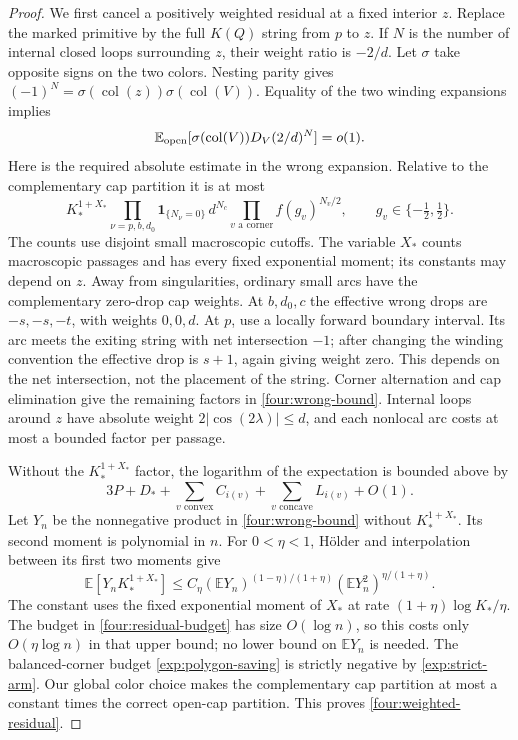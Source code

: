 \begin{proof}
We first cancel a positively weighted residual at a fixed interior $z$.
Replace the marked primitive by the full $K(Q)$ string from $p$ to $z$.
If $N$ is the number of internal closed loops surrounding $z$, their
weight ratio is $-2/d$.  Let $\sigma$ take opposite signs on the two
colors.  Nesting parity gives
$(-1)^N=\sigma(\operatorname{col}(z))\sigma(\operatorname{col}(V))$.
Equality of the two winding expansions implies
\begin{equation}
 \mathbb E_{\rm open}
       [\sigma(\operatorname{col}(V))D_V(2/d)^N]=o(1).
 \label{four:weighted-residual}
\end{equation}
Here is the required absolute estimate in the wrong expansion.
Relative to the complementary cap partition it is at most
\begin{equation}
 K_*^{1+X_*}
 \prod_{\nu=p,b,d_0}\mathbf1_{\{N_\nu=0\}}\,
 d^{N_c}\prod_{v\text{ a corner}}f(g_v)^{N_v/2},
 \qquad g_v\in\{-\tfrac12,\tfrac12\}.
 \label{four:wrong-bound}
\end{equation}
The counts use disjoint small macroscopic cutoffs.  The variable $X_*$
counts macroscopic passages and has every fixed exponential moment;
its constants may depend on $z$.  Away from singularities, ordinary
small arcs have the complementary zero-drop cap weights.  At $b,d_0,c$
the effective wrong drops are $-s,-s,-t$, with weights $0,0,d$.
At $p$, use a locally forward boundary interval.  Its arc meets the
exiting string with net intersection $-1$; after changing the winding
convention the effective drop is $s+1$, again giving weight zero.
This depends on the net intersection, not the placement of the string.
Corner alternation and cap elimination give the remaining factors in
\eqref{four:wrong-bound}.  Internal loops around $z$ have absolute
weight $2|\cos(2\lambda)|\le d$, and each nonlocal arc costs at most
a bounded factor per passage.

Without the $K_*^{1+X_*}$ factor, the logarithm of the expectation is
bounded above by
\begin{equation}
 3P+D_*+\sum_{v\text{ convex}}C_{i(v)}
          +\sum_{v\text{ concave}}L_{i(v)}+O(1).
 \label{four:residual-budget}
\end{equation}
Let $Y_n$ be the nonnegative product in \eqref{four:wrong-bound}
without $K_*^{1+X_*}$.  Its second moment is polynomial in $n$.
For $0<\eta<1$, H\"older and interpolation between its first two
moments give
\[
 \mathbb E[Y_nK_*^{1+X_*}]
 \le C_\eta(\mathbb E Y_n)^{(1-\eta)/(1+\eta)}
             (\mathbb E Y_n^2)^{\eta/(1+\eta)}.
\]
The constant uses the fixed exponential moment of $X_*$ at rate
$(1+\eta)\log K_*/\eta$.  The budget in
\eqref{four:residual-budget} has size $O(\log n)$, so this costs only
$O(\eta\log n)$ in that upper bound; no lower bound on
$\mathbb E Y_n$ is needed.  The balanced-corner budget
\eqref{exp:polygon-saving} is strictly negative by
\eqref{exp:strict-arm}.  Our global color choice makes the complementary
cap partition at most a constant times the correct open-cap partition.
This proves \eqref{four:weighted-residual}.


\end{proof}
